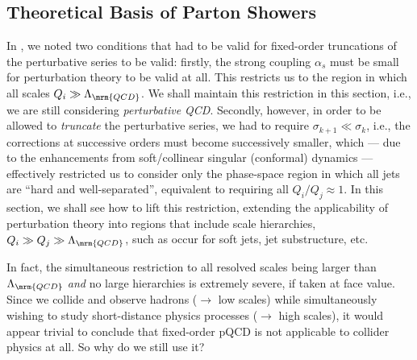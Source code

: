 \subsection{Theoretical Basis of Parton Showers\label{sec:parton-showers}}

In , we noted two 
conditions that had to be valid for fixed-order truncations of the
perturbative series to be valid: firstly, the strong coupling
$\alpha_s$ must be small for perturbation theory to be valid at
all. This restricts us to the region in which all scales $Q_i\gg
\Lambda_\mrm{QCD}$. We shall maintain this restriction in this
section, i.e., we are still considering \emph{perturbative QCD}. 
Secondly, however, in order to be allowed to \emph{truncate} the
perturbative 
series, we had to require  $\sigma_{k+1} \ll \sigma_k$, i.e., the
corrections at successive orders must become successively smaller, which --- due
to the enhancements from soft/collinear singular (conformal) dynamics
--- effectively restricted us to consider only the phase-space 
region in which all jets
are ``hard and well-separated'', equivalent to requiring all $Q_i/Q_j \approx
1$. 
In this section, we shall see how to lift this restriction,
extending the applicability of perturbation theory into regions that
include scale 
hierarchies, $Q_i \gg Q_j \gg \Lambda_\mrm{QCD}$, such as occur for
soft jets, jet substructure, etc.

In fact, the simultaneous restriction to all resolved scales being
larger than $\Lambda_{\mrm{QCD}}$ \emph{and} no large hierarchies is
extremely severe, if taken at face value. 
Since we collide and observe  hadrons ($\to$ low
scales) while
simultaneously wishing to study short-distance physics processes ($\to$ high
scales), it would appear trivial to conclude that fixed-order pQCD is not 
applicable to collider physics at all. So why do we still use it?

